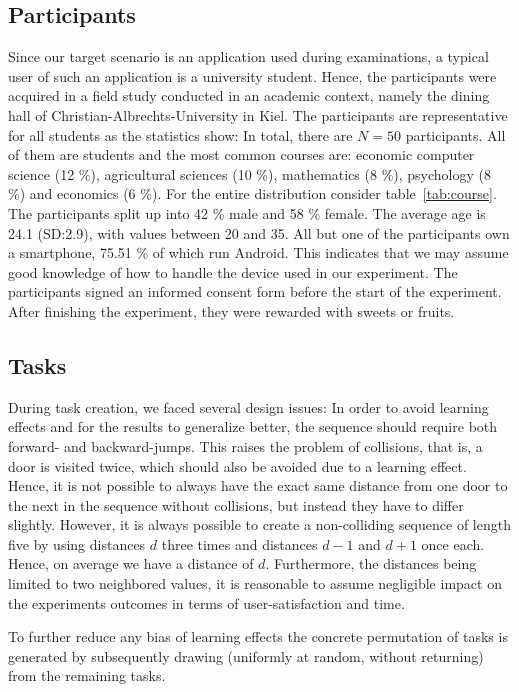 \documentclass{sig-alternate-05-2015}
\begin{document}
\subsection{Participants}
Since our target scenario is an application used during examinations,
a typical user of such an application is a university student.
Hence, the participants were acquired in a field study conducted in an academic context, namely the dining hall of Christian-Albrechts-University in Kiel.
The participants are representative for all students as the statistics show: In total, there are $N = 50$ participants.
All of them are students and the most common courses are: economic computer science (12 \%), agricultural sciences (10 \%), mathematics (8 \%), psychology (8 \%) and economics (6 \%).
For the entire distribution consider table~\ref{tab:course}.
The participants split up into 42 \% male and 58 \% female. The average age is 24.1 (SD:\@2.9),
with values between 20 and 35. 
All but one of the participants own a
smartphone, 75.51 \% of which run Android. This indicates that we may assume good knowledge
of how to handle the device used in our experiment.
The participants signed an informed consent form before the start of the experiment. After
finishing the experiment, they were rewarded with sweets or fruits.

\subsection{Tasks}
\label{sec:task}
During task creation, we faced several design issues: In order to avoid learning effects and for the results to generalize better, 
the sequence should require both forward- and backward-jumps. This raises the problem of collisions, that is, a door is visited twice, which
should also be avoided due to a learning effect. Hence, it is not possible to always have the exact same distance from one door to the
next in the sequence without collisions, but instead they have to differ slightly. However, it is always possible to create a non-colliding sequence of
length five by using distances $d$ three times and distances $d - 1$ and $d + 1$ once each. Hence, on average we have a distance of $d$. 
Furthermore, the distances being limited to two neighbored values, it is reasonable to assume negligible
impact on the experiments outcomes in terms of user-satisfaction and time.

To further reduce any bias of learning effects
the concrete permutation of tasks is generated by subsequently drawing
(uniformly at random, without returning) from the remaining tasks.
\end{document}
